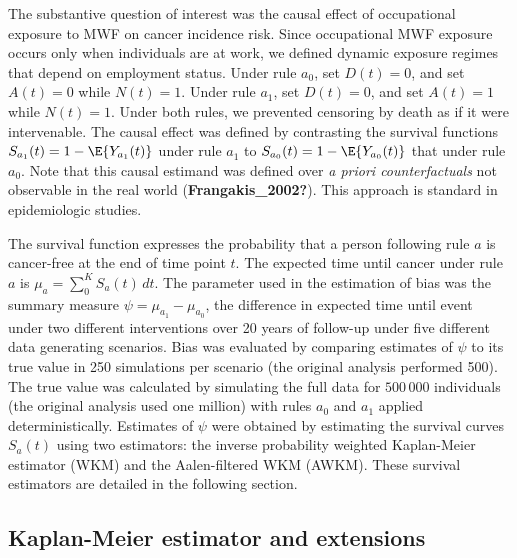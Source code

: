 \documentclass[
  11pt,
]{article}
\begin{document}
The substantive question of interest was the causal effect of
occupational exposure to MWF on cancer incidence risk. Since
occupational MWF exposure occurs only when individuals are at work, we
defined dynamic exposure regimes that depend on employment status. Under
rule \(a_0\), set \(D(t) = 0\), and set \(A(t) = 0\) while \(N(t) = 1\).
Under rule \(a_1\), set \(D(t) = 0\), and set \(A(t) = 1\) while
\(N(t) = 1\). Under both rules, we prevented censoring by death as if it
were intervenable. The causal effect was defined by contrasting the
survival functions \(S_{a_1}(t) = 1 - \E{Y_{a_1}(t)}\) under rule
\(a_1\) to \(S_{a_0}(t) = 1 - \E{Y_{a_0}(t)}\) that under rule \(a_0\).
Note that this causal estimand was defined over \emph{a priori
counterfactuals} not observable in the real world
(\textbf{Frangakis\_2002?}). This approach is standard in epidemiologic
studies.

The survival function expresses the probability that a person following
rule \(a\) is cancer-free at the end of time point \(t\). The expected
time until cancer under rule \(a\) is
\(\mu_{a} = \sum_0^K S_{a}(t) \, dt\). The parameter used in the
estimation of bias was the summary measure
\(\psi = \mu_{a_1} - \mu_{a_0}\), the difference in expected time until
event under two different interventions over 20 years of follow-up under
five different data generating scenarios. Bias was evaluated by
comparing estimates of \(\psi\) to its true value in 250 simulations per
scenario (the original analysis performed 500). The true value was
calculated by simulating the full data for \(500\,000\) individuals (the
original analysis used one million) with rules \(a_0\) and \(a_1\)
applied deterministically. Estimates of \(\psi\) were obtained by
estimating the survival curves \(S_a(t)\) using two estimators: the
inverse probability weighted Kaplan-Meier estimator (WKM) and the
Aalen-filtered WKM (AWKM). These survival estimators are detailed in the
following section.

\hypertarget{kaplan-meier-estimator-and-extensions}{%
\subsection{Kaplan-Meier estimator and
extensions}\label{kaplan-meier-estimator-and-extensions}}
\end{document}
